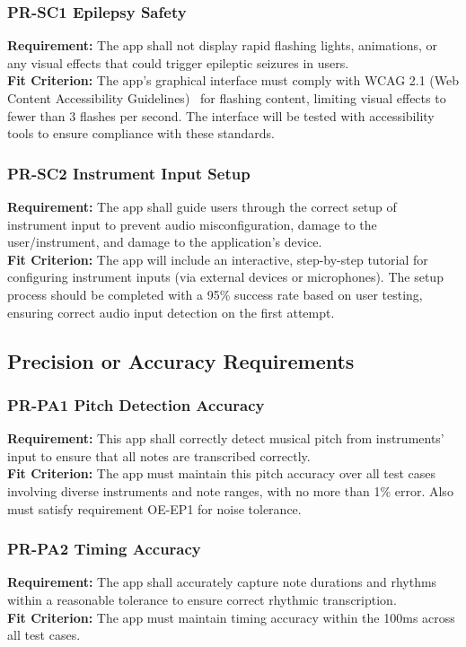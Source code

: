 \documentclass[12pt]{article}
\begin{document}
\subsubsection*{PR-SC1 Epilepsy Safety} \label{PR-SC1}
\textbf{Requirement:} The app shall not display rapid flashing lights, animations, or any visual effects that could trigger epileptic seizures in users.\\
\textbf{Fit Criterion:} The app’s graphical interface must comply with WCAG 2.1 (Web Content Accessibility Guidelines)~\cite{WCAG-Seizures} for flashing content, limiting visual effects to fewer than 3 flashes per second. The interface will be tested with accessibility tools to ensure compliance with these standards.
\subsubsection*{PR-SC2 Instrument Input Setup} \label{PR-SC2}
\textbf{Requirement:} The app shall guide users through the correct setup of instrument input to prevent audio misconfiguration, damage to the user/instrument, and damage to the application’s device.\\
\textbf{Fit Criterion:} The app will include an interactive, step-by-step tutorial for configuring instrument inputs (via external devices or microphones). The setup process should be completed with a 95\% success rate based on user testing, ensuring correct audio input detection on the first attempt.

\subsection{Precision or Accuracy Requirements}
\subsubsection*{PR-PA1 Pitch Detection Accuracy} \label{PR-PA1}
\textbf{Requirement:} This app shall correctly detect musical pitch from instruments' input to ensure that all notes are transcribed correctly.\\
\textbf{Fit Criterion:} The app must maintain this pitch accuracy over all test cases involving diverse instruments and note ranges, with no more than 1\% error. Also must satisfy requirement OE-EP1 for noise tolerance.
\subsubsection*{PR-PA2 Timing Accuracy} \label{PR-PA2}
\textbf{Requirement:} The app shall accurately capture note durations and rhythms within a reasonable tolerance to ensure correct rhythmic transcription.\\
\textbf{Fit Criterion:} The app must maintain timing accuracy within the 100ms across all test cases.
\end{document}
